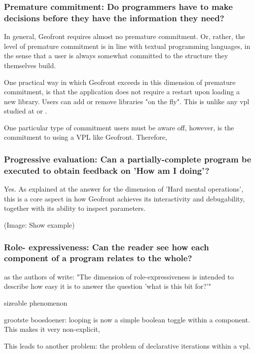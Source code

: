 \subsubsection*{Premature commitment: Do programmers have to make decisions before they have the information they need?}

In general, Geofront requires almost no premature commitment. 
Or, rather, the level of premature commitment is in line with textual programming languages, in the sense that a user is always somewhat committed to the structure they themselves build. 

One practical way in which Geofront exceeds in this dimension of premature commitment, is that the application does not require a restart upon loading a new library. 
Users can add or remove libraries "on the fly". 
This is unlike any vpl studied at  or .

One particular type of commitment users must be aware off, however, is the commitment to using a \ac{VPL} like Geofront. 
Therefore, 


\subsubsection*{Progressive evaluation: Can a partially-complete program be executed to obtain feedback on 'How am I doing'?}

Yes. 
As explained at the answer for the dimension of 'Hard mental operations', this is a core aspect in how Geofront achieves its interactivity and debugability, together with its ability to inspect parameters. 

(Image: Show example)

\subsubsection*{Role- expressiveness: Can the reader see how each component of a program relates to the whole?}

as the authors of \cite[]{green_usability_1996} write: "The dimension of role-expressiveness is intended to describe how easy it is to answer the question 'what is this bit for?'"

sizeable phenomenon

grootste boosdoener: looping is now a simple boolean toggle within a component. 
This makes it very non-explicit, 

This leads to another problem: the problem of declarative iterations within a vpl. 


